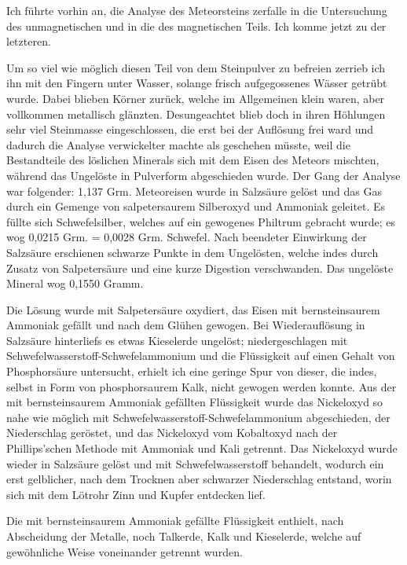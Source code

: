 \documentclass[a4paper, 11pt, oneside]{article}
\begin{document}
Ich führte vorhin an, die Analyse des Meteorsteins zerfalle in die Untersuchung des unmagnetischen und in die des magnetischen Teils. Ich komme jetzt zu der letzteren.

Um so viel wie möglich diesen Teil von dem Steinpulver zu befreien zerrieb ich ihn mit den Fingern unter Wasser, solange frisch aufgegossenes Wässer getrübt wurde. Dabei blieben Körner zurück, welche im Allgemeinen klein waren, aber vollkommen metallisch glänzten. Desungeachtet blieb doch in ihren Höhlungen sehr viel Steinmasse eingeschlossen, die erst bei der Auflösung frei ward und dadurch die Analyse verwickelter machte als geschehen müsste, weil die Bestandteile des löslichen Minerals sich mit dem Eisen des Meteors mischten, während das Ungelöste in Pulverform abgeschieden wurde. Der Gang der Analyse war folgender: 1,137 Grm. Meteoreisen wurde in Salzsäure gelöst und das Gas durch ein Gemenge von salpetersaurem Silberoxyd und Ammoniak geleitet. Es füllte sich Schwefelsilber, welches auf ein gewogenes Philtrum gebracht wurde; es wog 0,0215 Grm. = 0,0028 Grm. Schwefel. Nach beendeter Einwirkung der Salzsäure erschienen schwarze Punkte in dem Ungelösten, welche indes durch Zusatz von Salpetersäure und eine kurze Digestion verschwanden. Das ungelöste Mineral wog 0,1550 Gramm.

Die Lösung wurde mit Salpetersäure oxydiert, das Eisen mit bernsteinsaurem Ammoniak gefällt und nach dem Glühen gewogen. Bei Wiederauflösung in Salzsäure hinterliefs es etwas Kieselerde ungelöst; niedergeschlagen mit Schwefelwasserstoff-Schwefelammonium und die Flüssigkeit auf einen Gehalt von Phosphorsäure untersucht, erhielt ich eine geringe Spur von dieser, die indes, selbst in Form von phosphorsaurem Kalk, nicht gewogen werden konnte. Aus der mit bernsteinsaurem Ammoniak gefällten Flüssigkeit wurde das Nickeloxyd so nahe wie möglich mit Schwefelwasserstoff-Schwefelammonium abgeschieden, der Niederschlag geröstet, und das Nickeloxyd vom Kobaltoxyd nach der Phillips'schen Methode mit Ammoniak und Kali getrennt. Das Nickeloxyd wurde wieder in Salzsäure gelöst und mit Schwefelwasserstoff behandelt, wodurch ein erst gelblicher, nach dem Trocknen aber schwarzer Niederschlag entstand, worin sich mit dem Lötrohr Zinn und Kupfer entdecken lief.

Die mit bernsteinsaurem Ammoniak gefällte Flüssigkeit enthielt, nach Abscheidung der Metalle, noch Talkerde, Kalk und Kieselerde, welche auf gewöhnliche Weise voneinander getrennt wurden.
\end{document}

